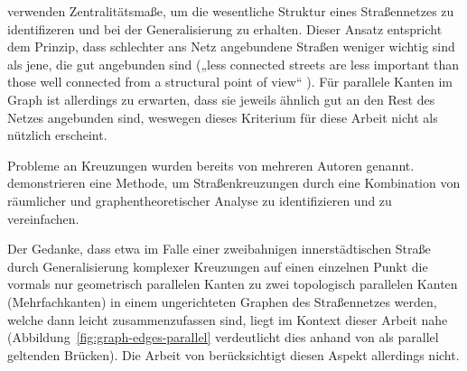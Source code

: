 \documentclass[../main/thesis.tex]{subfiles}
\begin{document}

 verwenden Zentralitätsmaße, um die wesentliche Struktur eines Straßennetzes zu identifizeren und bei der Generalisierung zu erhalten.
Dieser Ansatz entspricht dem Prinzip, dass schlechter ans Netz angebundene Straßen weniger wichtig sind als jene, die gut angebunden sind („less connected streets are less important than those well connected from a structural point of view“ ). 
Für parallele Kanten im Graph ist allerdings zu erwarten, dass sie jeweils ähnlich gut an den Rest des Netzes angebunden sind, weswegen dieses Kriterium für diese Arbeit nicht als nützlich erscheint.


Probleme an Kreuzungen wurden bereits von mehreren Autoren genannt.
 demonstrieren eine Methode, um Straßenkreuzungen durch eine Kombination von räumlicher und graphentheoretischer Analyse zu identifizieren und zu vereinfachen. 

Der Gedanke, dass etwa im Falle einer zweibahnigen innerstädtischen Straße durch Generalisierung komplexer Kreuzungen auf einen einzelnen Punkt die vormals nur geometrisch parallelen Kanten zu zwei topologisch parallelen Kanten (Mehrfachkanten) in einem ungerichteten Graphen des Straßennetzes werden, welche dann leicht zusammenzufassen sind, liegt im Kontext dieser Arbeit nahe (Abbildung~\ref{fig:graph-edges-parallel} verdeutlicht dies anhand von als parallel geltenden Brücken).
Die Arbeit von \citeauthor{MM99} berücksichtigt diesen Aspekt allerdings nicht.
\end{document}
